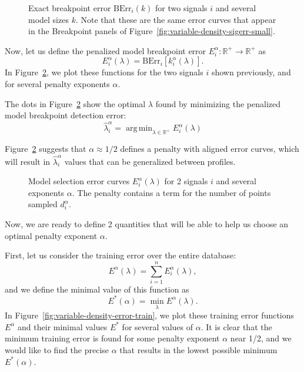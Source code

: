 \documentclass{jsfds} %
\newcommand{\fig}[3][H]{
  \begin{figure}[#1]
    \hskip -1cm
    
    \caption{#3}
    \label{fig:#2}
  \end{figure}
}
\DeclareMathOperator*{\argmin}{arg\,min}
\newcommand{\RR}{\mathbb{R}}
\begin{document}
\fig{variable-density-berr-k}{Exact breakpoint error
  $\text{BErr}_i(k)$ for two signals $i$ and several model
  sizes $k$. Note that these are the same error curves that appear
in the Breakpoint panels of Figure~\ref{fig:variable-density-sigerr-small}.}

\newpage

Now, let us define the penalized
model breakpoint error $E^\alpha_i:\RR^+\rightarrow\RR^+$ as
\begin{equation}
  \label{eq:lerr}
E^\alpha_i(\lambda) = \text{BErr}_i\left[
k^\alpha_i(\lambda)
\right].
\end{equation}
In Figure~\ref{fig:variable-density-berr}, we plot these functions for the
two signals $i$ shown previously, and for several penalty exponents $\alpha$.

The dots in Figure~\ref{fig:variable-density-berr} show the optimal
$\lambda$ found by minimizing the penalized model breakpoint detection
error:
\begin{equation}
  \label{eq:lambda_hat}
  \hat \lambda^\alpha_i = \argmin_{\lambda\in\RR^+}  E^\alpha_i(\lambda)
\end{equation}

Figure~\ref{fig:variable-density-berr} suggests that $\alpha\approx1/2$
defines a penalty with aligned error curves, which will result in
$\hat \lambda_i^\alpha$ values that can be generalized between
profiles. 

\fig{variable-density-berr}{Model selection error curves
  $E_i^\alpha(\lambda)$ for 2 signals $i$ and several exponents
  $\alpha$. The penalty contains a term for the number of points sampled $d_i^\alpha$.}

\newpage

Now, we are ready to define 2 quantities that will be able to help us
choose an optimal penalty exponent $\alpha$.

First, let us consider the training error over the entire database:
\begin{equation}
  \label{eq:lerr_train}
  E^\alpha(\lambda) = \sum_{i=1}^n E_i^\alpha(\lambda),
\end{equation}
and we define the minimal value of this function as
\begin{equation}
  \label{eq:lerr_train_min}
  E^*(\alpha) = \min_\lambda E^\alpha(\lambda).
\end{equation}
In Figure~\ref{fig:variable-density-error-train}, we plot these
training error functions $E^\alpha$ and their minimal values $E^*$ for
several values of $\alpha$. It is clear that the minimum training
error is found for some penalty exponent $\alpha$ near 1/2, and we
would like to find the precise $\alpha$ that results in the lowest
possible minimum $E^*(\alpha)$.
\end{document}
